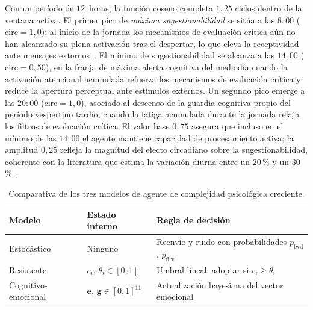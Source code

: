 Con un período de $12$~horas, la función coseno completa $1{,}25$ ciclos dentro de la ventana activa. El primer pico de \emph{máxima sugestionabilidad} se sitúa a las $8{:}00$ ($\mathrm{circ} = 1{,}0$): al inicio de la jornada los mecanismos de evaluación crítica aún no han alcanzado su plena activación tras el despertar, lo que eleva la receptividad ante mensajes externos~\cite{GolderMacy2011}. El mínimo de sugestionabilidad se alcanza a las $14{:}00$ ($\mathrm{circ} = 0{,}50$), en la franja de máxima alerta cognitiva del mediodía cuando la activación atencional acumulada refuerza los mecanismos de evaluación crítica y reduce la apertura perceptual ante estímulos externos. Un segundo pico emerge a las $20{:}00$ ($\mathrm{circ} = 1{,}0$), asociado al descenso de la guardia cognitiva propio del período vespertino tardío, cuando la fatiga acumulada durante la jornada relaja los filtros de evaluación crítica. El valor base $0{,}75$ asegura que incluso en el mínimo de las $14{:}00$ el agente mantiene capacidad de procesamiento activa; la amplitud $0{,}25$ refleja la magnitud del efecto circadiano sobre la sugestionabilidad, coherente con la literatura que estima la variación diurna entre un $20$\,\% y un $30$\,\%~\cite{GolderMacy2011}.

\begin{table}[h!]
\centering
\small
\caption{Comparativa de los tres modelos de agente de complejidad psicológica creciente.}
\label{tab:agentes}
\begin{tabular}{@{}p{3.2cm} p{3cm} p{8cm}@{}}
\toprule
\textbf{Modelo} &
\textbf{Estado interno} &
\textbf{Regla de decisión} \\
\midrule
Estocástico
  & Ninguno
  & Reenvío y ruido con probabilidades $p_{\text{fwd}}$, $p_{\text{fire}}$ \\
\addlinespace
Resistente
  & $c_i,\,\theta_i \in [0,1]$
  & Umbral lineal: adoptar si $c_i \geq \theta_i$ \cite{KempeKleinbergTardos2003,Granovetter1978} \\
\addlinespace
Cognitivo-emocional
  & $\mathbf{e},\,\mathbf{g} \in [0,1]^{11}$
  & Actualización bayesiana del vector emocional \cite{Friston2010,Plutchik1980} \\
\bottomrule
\end{tabular}
\end{table}
